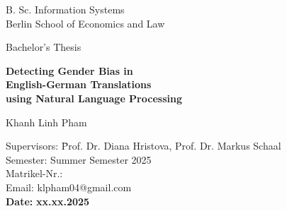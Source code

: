\thispagestyle{empty}

\begin{center}

\vspace*{-10mm}

{\LARGE B. Sc. Information Systems\\[1mm]}
Berlin School of Economics and Law\\
\vspace*{\fill} 

\vspace*{1cm}

{\Large {Bachelor's Thesis}}\\ 

\vspace{1cm}

{\Large \textbf{Detecting Gender Bias in}}\\ 
\vspace*{2mm}
{\Large \textbf{English-German Translations}}\\ 
\vspace*{2mm}
{\Large \textbf{using Natural Language Processing}}\\

\vspace{1.5cm}

{\LARGE Khanh Linh Pham}\\[15mm]

\vspace*{\fill} 

\parbox{120mm}{
\begin{large}
\begin{tabbing}
Supervisors: \hspace{.7cm} \=Prof. Dr. Diana Hristova, Prof. Dr. Markus Schaal\\[4mm]
Semester:\> Summer Semester 2025\\
Matrikel-Nr.:\\
Email:\> klpham04@gmail.com\\[8mm]
\textbf{Date:} \> \textbf{xx.xx.2025}\\
\end{tabbing}
\end{large}
}

\end{center}

\clearpage{\pagestyle{empty}\cleardoublepage}